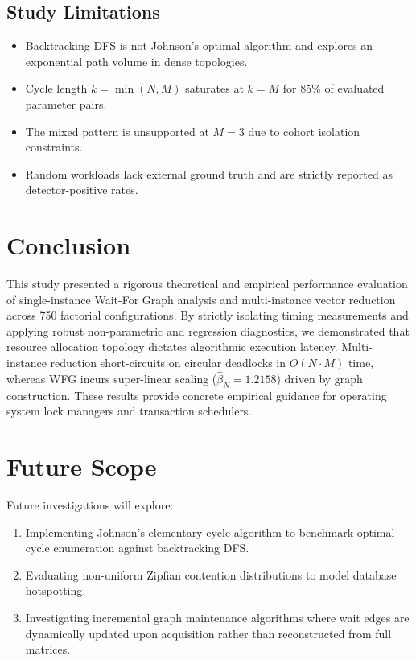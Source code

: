 \documentclass[11pt,a4paper]{article}
\begin{document}
\subsection{Study Limitations}
\begin{itemize}
    \item Backtracking DFS is not Johnson's optimal algorithm and explores an exponential path volume in dense topologies.
    \item Cycle length $k = \min(N, M)$ saturates at $k=M$ for 85\% of evaluated parameter pairs.
    \item The mixed pattern is unsupported at $M=3$ due to cohort isolation constraints.
    \item Random workloads lack external ground truth and are strictly reported as detector-positive rates.
\end{itemize}

\section{Conclusion}
This study presented a rigorous theoretical and empirical performance evaluation of single-instance Wait-For Graph analysis and multi-instance vector reduction across 750 factorial configurations. By strictly isolating timing measurements and applying robust non-parametric and regression diagnostics, we demonstrated that resource allocation topology dictates algorithmic execution latency. Multi-instance reduction short-circuits on circular deadlocks in $O(N \cdot M)$ time, whereas WFG incurs super-linear scaling ($\hat{\beta}_N = 1.2158$) driven by graph construction. These results provide concrete empirical guidance for operating system lock managers and transaction schedulers.

\section{Future Scope}
Future investigations will explore:
\begin{enumerate}
    \item Implementing Johnson's elementary cycle algorithm to benchmark optimal cycle enumeration against backtracking DFS.
    \item Evaluating non-uniform Zipfian contention distributions to model database hotspotting.
    \item Investigating incremental graph maintenance algorithms where wait edges are dynamically updated upon acquisition rather than reconstructed from full matrices.
\end{enumerate}
\end{document}
